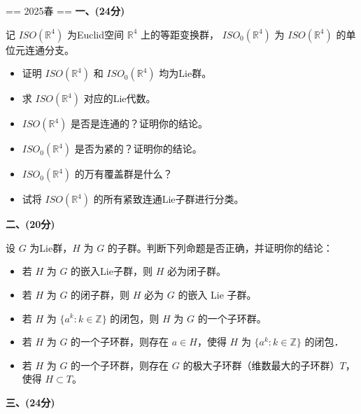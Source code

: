 == 2025春 ==
\textbf{一、(24分)}

记 $ISO(\mathbb{R}^4)$ 为Euclid空间 $\mathbb{R}^4$ 上的等距变换群，
$ISO_0(\mathbb{R}^4)$ 为 $ISO(\mathbb{R}^4)$ 的单位元连通分支。
\begin{itemize}
\item 证明 $ISO(\mathbb{R}^4)$ 和 $ISO_0(\mathbb{R}^4)$ 均为Lie群。
\item 求 $ISO(\mathbb{R}^4)$ 对应的Lie代数。
\item $ISO(\mathbb{R}^4)$ 是否是连通的？证明你的结论。
\item $ISO_0(\mathbb{R}^4)$ 是否为紧的？证明你的结论。
\item $ISO_0(\mathbb{R}^4)$ 的万有覆盖群是什么？
\item 试将 $ISO(\mathbb{R}^4)$ 的所有紧致连通Lie子群进行分类。
\end{itemize}

\textbf{二、(20分)}

设 $G$ 为Lie群，$H$ 为 $G$ 的子群。判断下列命题是否正确，并证明你的结论：
\begin{itemize}
\item 若 $H$ 为 $G$ 的嵌入Lie子群，则 $H$ 必为闭子群。
\item 若 $H$ 为 $G$ 的闭子群，则 $H$ 必为 $G$ 的嵌入 Lie 子群。
\item 若 $H$ 为 $\{a^k: k \in \mathbb{Z}\}$ 的闭包，则 $H$ 为 $G$ 的一个子环群。
\item 若 $H$ 为 $G$ 的一个子环群，则存在 $a \in H$，使得 $H$ 为 $\{a^k: k \in \mathbb{Z}\}$ 的闭包．
\item 若 $H$ 为 $G$ 的一个子环群，则存在 $G$ 的极大子环群（维数最大的子环群）$T$，使得 $H \subset T$。
\end{itemize}

\textbf{三、(24分)}

